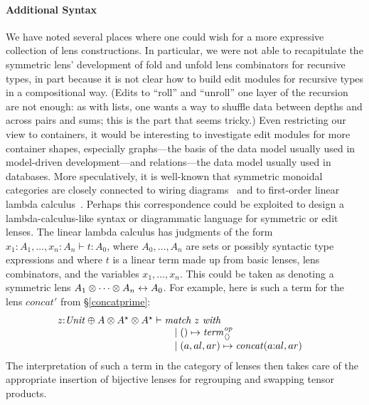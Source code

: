 \paragraph*{Additional Syntax}
We have noted several places where one could wish
for a more expressive collection of lens constructions. In particular, we
were not able to recapitulate the symmetric lens' development of fold and
unfold lens combinators for recursive types, in part because it is not clear
how to build edit modules for recursive types in a compositional way. (Edits
to ``roll'' and ``unroll'' one layer of the recursion are not enough: as
with lists, one wants a way to shuffle data between depths and across pairs
and sums; this is the part that seems tricky.) Even restricting our view to
containers, it would be interesting to investigate edit modules for more
container shapes, especially graphs---the basis of the data model usually
used in model-driven development---and relations---the data model usually
used in databases. More speculatively, it is well-known that symmetric
monoidal categories are closely connected to wiring
diagrams~\cite{selinger2011survey} and to first-order linear lambda
calculus~\cite{seely1987linear}. Perhaps this correspondence could be
exploited to design a lambda-calculus-like syntax or diagrammatic
language for symmetric or edit lenses. The linear lambda calculus has
judgments of the form $x_1{:}A_1,\dots,x_n{:}A_n\vdash t:A_0$, where
$A_0,\dots,A_n$ are sets or possibly syntactic type expressions and where
$t$ is a linear term made up from basic lenses, lens combinators, and the
variables $x_1,\dots,x_n$. This could be taken as denoting a symmetric lens
$A_1\otimes\dots\otimes A_n\leftrightarrow A_0$. For example, here is such a term for
the lens $\mathit{concat}'$ from \S\ref{concatprime}:
\[\begin{array}{@{}l}
z{:}\Unit \oplus A \otimes A\LIST\otimes A\LIST\vdash
    \begin{array}[t]{@{}l}
    \textit{match}\ z\ \textit{with} \\
    \quad \mid\mlinl\unit \mapsto \const_{\NIL}\op\\
    \quad\mid\mlinr(a,al,ar)\mapsto \mathit{concat}(a\CONS al,ar)
    \end{array}
\end{array}
\]
The interpretation of such a term in the category of lenses then takes care
of the appropriate insertion of bijective lenses for regrouping and swapping
tensor products.

